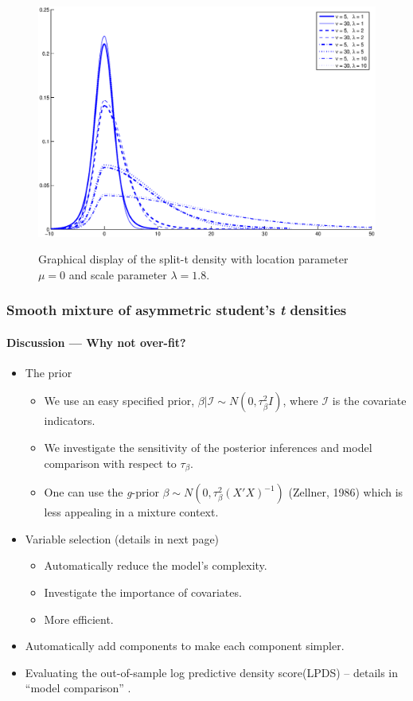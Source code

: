 \documentclass[10pt]{beamer}
\begin{document}
\begin{frame}[plain]
\begin{center}
\begin{figure}
    \includegraphics[height=8.4cm]{Density_Skewness.eps}
    \caption{\footnotesize{Graphical display of the split-t density with location
        parameter $\mu = 0$ and scale parameter $\lambda= 1.8$.}}\label{fg:sp500} 
  \end{figure}
\end{center}
\end{frame}


\begin{frame}
\frametitle{Smooth mixture of asymmetric student's {\em t} densities}
\framesubtitle{Discussion --- Why not over-fit?}
\begin{itemize}
\item The prior
\begin{itemize}
\item We use an easy specified prior,  $\beta|\mathcal{I} \sim N(0, \tau_{\beta}^2I)$, where $\mathcal{I}$ is the covariate
  indicators. 
\item We investigate the sensitivity of the posterior inferences and model comparison with
  respect to $\tau_{\beta}$.  
\item One can use the \emph{g}-prior $\beta \sim N(0, \tau_{\beta}^2(X'X)^{-1})$ (Zellner, 1986)
  which is less appealing in a mixture context.  
\end{itemize}
\item Variable selection (details in next page)
\begin{itemize}
\item Automatically reduce the model's complexity.
\item Investigate the importance of covariates.
\item More efficient.
\end{itemize}
\item Automatically add components to make each component simpler.  
\item Evaluating the out-of-sample log predictive density score(LPDS) -- details in
  ``model comparison'' .
\end{itemize}
\end{frame}
 
\end{document}
